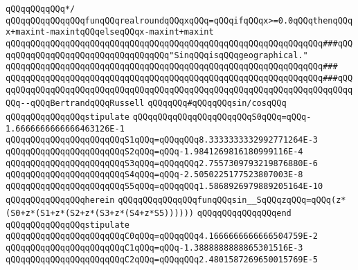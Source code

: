 \verb|qQQqqQQqqQQq*/|\newline
\verb|qQQqqQQqqQQqqQQqfunqQQqrealroundqQQqxqQQq=qQQqifqQQqx>=0.0qQQqthenqQQqx+maxint-maxintqQQqelseqQQqx-maxint+maxint|\newline
\newline
\newline
\newline
\verb|qQQqqQQqqQQqqQQqqQQqqQQqqQQqqQQqqQQqqQQqqQQqqQQqqQQqqQQqqQQqqQQq###qQQqqQQqqQQqqQQqqQQqqQQqqQQqqQQqqQQq"SinqQQqisqQQqgeographical."|\newline
\verb|qQQqqQQqqQQqqQQqqQQqqQQqqQQqqQQqqQQqqQQqqQQqqQQqqQQqqQQqqQQqqQQq###|\newline
\verb|qQQqqQQqqQQqqQQqqQQqqQQqqQQqqQQqqQQqqQQqqQQqqQQqqQQqqQQqqQQqqQQq###qQQqqQQqqQQqqQQqqQQqqQQqqQQqqQQqqQQqqQQqqQQqqQQqqQQqqQQqqQQqqQQqqQQqqQQqqQQq--qQQqBertrandqQQqRussell|\newline
\newline
\newline
\newline
\verb|qQQqqQQq#qQQqqQQqsin/cosqQQq|\newline
\verb|qQQqqQQqqQQqqQQqstipulate|\newline
\verb|qQQqqQQqqQQqqQQqqQQqqQQqS0qQQq=qQQq-1.6666666666666463126E-1|\newline
\verb|qQQqqQQqqQQqqQQqqQQqqQQqS1qQQq=qQQqqQQq8.3333333332992771264E-3|\newline
\verb|qQQqqQQqqQQqqQQqqQQqqQQqS2qQQq=qQQq-1.9841269816180999116E-4|\newline
\verb|qQQqqQQqqQQqqQQqqQQqqQQqS3qQQq=qQQqqQQq2.7557309793219876880E-6|\newline
\verb|qQQqqQQqqQQqqQQqqQQqqQQqS4qQQq=qQQq-2.5050225177523807003E-8|\newline
\verb|qQQqqQQqqQQqqQQqqQQqqQQqS5qQQq=qQQqqQQq1.5868926979889205164E-10|\newline
\verb|qQQqqQQqqQQqqQQqherein|\newline
\verb|qQQqqQQqqQQqqQQqfunqQQqsin__SqQQqzqQQq=qQQq(z*(S0+z*(S1+z*(S2+z*(S3+z*(S4+z*S5))))))|\newline
\verb|qQQqqQQqqQQqqQQqend|\newline
\newline
\verb|qQQqqQQqqQQqqQQqstipulate|\newline
\verb|qQQqqQQqqQQqqQQqqQQqqQQqC0qQQq=qQQqqQQq4.1666666666666504759E-2|\newline
\verb|qQQqqQQqqQQqqQQqqQQqqQQqC1qQQq=qQQq-1.3888888888865301516E-3|\newline
\verb|qQQqqQQqqQQqqQQqqQQqqQQqC2qQQq=qQQqqQQq2.4801587269650015769E-5|\newline
